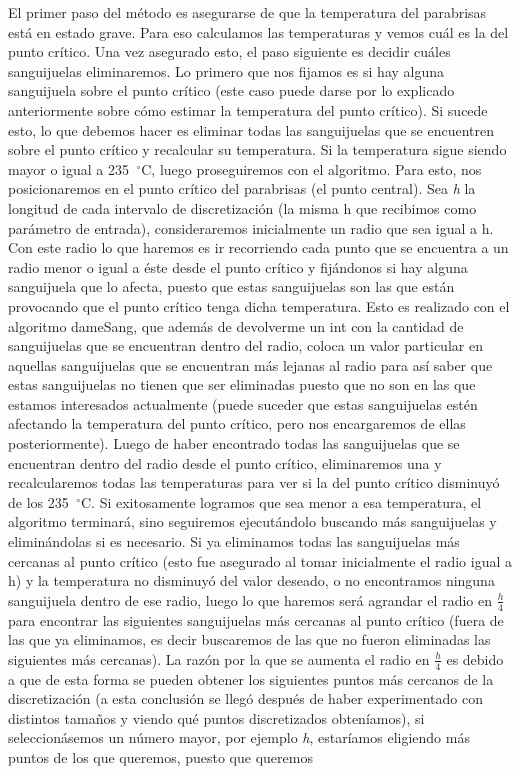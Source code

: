 \documentclass[10pt, a4paper]{article}
\begin{document}
El primer paso del m\'etodo es asegurarse de que la temperatura del parabrisas est\'a en estado grave. Para eso calculamos las temperaturas y vemos cu\'al es la del punto cr\'itico. Una vez asegurado esto, el paso siguiente es decidir cu\'ales sanguijuelas eliminaremos. Lo primero que nos fijamos es si hay alguna sanguijuela sobre el punto cr\'itico (este caso puede darse por lo explicado anteriormente  sobre c\'omo estimar la temperatura del punto cr\'itico). Si sucede esto, lo que debemos hacer es eliminar todas las sanguijuelas que se encuentren sobre el punto cr\'itico y recalcular su temperatura. Si la temperatura sigue siendo mayor o igual a 235\hspace{-1.5mm}$\phantom{a}^{\circ}$C, luego proseguiremos con el algoritmo. Para esto, nos posicionaremos en el punto crítico del parabrisas (el punto central). Sea \textit{h} la longitud de cada intervalo de discretizaci\'on (la misma h que recibimos como par\'ametro de entrada), consideraremos inicialmente un radio que sea igual a h. Con este radio lo que haremos es ir recorriendo cada punto que se encuentra a un radio menor o igual a \'este desde el punto cr\'itico y fij\'andonos si hay alguna sanguijuela que lo afecta, puesto que estas sanguijuelas son las que est\'an provocando que el punto cr\'itico tenga dicha temperatura. Esto es realizado con el algoritmo dameSang, que adem\'as de devolverme un int con la cantidad de sanguijuelas que se encuentran dentro del radio, coloca un valor particular en aquellas sanguijuelas que se encuentran m\'as lejanas al radio para as\'i saber que estas sanguijuelas no tienen que ser eliminadas puesto que no son en las que estamos interesados actualmente (puede suceder que estas sanguijuelas est\'en afectando la temperatura del punto cr\'itico, pero nos encargaremos de ellas posteriormente). Luego de haber encontrado todas las sanguijuelas que se encuentran dentro del radio desde el punto cr\'itico,  eliminaremos una y recalcularemos todas las temperaturas para ver si la del punto cr\'itico disminuy\'o de los 235\hspace{-1.5mm}$\phantom{a}^{\circ}$C. Si exitosamente logramos que sea menor a esa temperatura, el algoritmo terminar\'a, sino seguiremos ejecut\'andolo buscando m\'as sanguijuelas y elimin\'andolas si es necesario. Si ya eliminamos todas las sanguijuelas m\'as cercanas al punto cr\'itico (esto fue asegurado al tomar inicialmente el radio igual a h) y la temperatura no disminuy\'o del valor deseado, o no encontramos ninguna sanguijuela dentro de ese radio, luego lo que haremos ser\'a agrandar el radio en $\frac{h}{4}$ para encontrar las siguientes sanguijuelas m\'as cercanas al punto cr\'itico (fuera de las que ya eliminamos, es decir buscaremos de las que no fueron eliminadas las siguientes m\'as cercanas). La raz\'on por la que se aumenta el radio en $\frac{h}{4}$ es debido a que de esta forma se pueden obtener los siguientes puntos m\'as cercanos de la discretizaci\'on (a esta conclusi\'on se lleg\'o despu\'es de haber experimentado con distintos tamaños y viendo qu\'e puntos discretizados obten\'iamos), si seleccion\'asemos un n\'umero mayor, por ejemplo \textit{h}, estar\'iamos eligiendo m\'as puntos de los que queremos, puesto que queremos 
\end{document}
